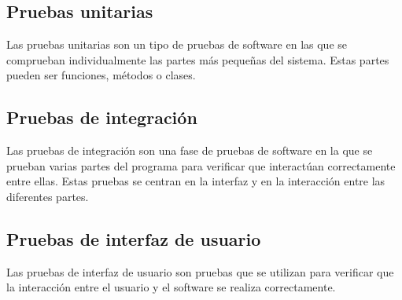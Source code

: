 \subsection{Pruebas unitarias}

Las pruebas unitarias son un tipo de pruebas de software en las que se comprueban individualmente las partes más pequeñas del sistema. Estas partes pueden ser funciones, métodos o clases.

\subsection{Pruebas de integración}

Las pruebas de integración son una fase de pruebas de software en la que se prueban varias partes del programa para verificar que interactúan correctamente entre ellas. Estas pruebas se centran en la interfaz y en la interacción entre las diferentes partes.

\subsection{Pruebas de interfaz de usuario}

Las pruebas de interfaz de usuario son pruebas que se utilizan para verificar que la interacción entre el usuario y el software se realiza correctamente.